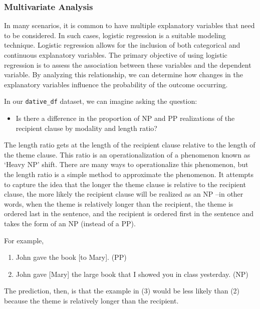 \documentclass[
  letterpaper,
  DIV=11,
  numbers=noendperiod]{scrreprt}
\providecommand{\tightlist}{%
  \setlength{\itemsep}{0pt}\setlength{\parskip}{0pt}}\usepackage{longtable,booktabs,array}
\theoremstyle{definition}
\theoremstyle{remark}
\begin{document}
\subsubsection{Multivariate Analysis}\label{multivariate-analysis}

In many scenarios, it is common to have multiple explanatory variables
that need to be considered. In such cases, logistic regression is a
suitable modeling technique. Logistic regression allows for the
inclusion of both categorical and continuous explanatory variables. The
primary objective of using logistic regression is to assess the
association between these variables and the dependent variable. By
analyzing this relationship, we can determine how changes in the
explanatory variables influence the probability of the outcome
occurring.

In our \texttt{dative\_df} dataset, we can imagine asking the question:

\begin{itemize}
\tightlist
\item
  Is there a difference in the proportion of NP and PP realizations of
  the recipient clause by modality and length ratio?
\end{itemize}

The length ratio gets at the length of the recipient clause relative to
the length of the theme clause. This ratio is an operationalization of a
phenomenon known as `Heavy NP' shift. There are many ways to
operationalize this phenomenon, but the length ratio is a simple method
to approximate the phenomenon. It attempts to capture the idea that the
longer the theme clause is relative to the recipient clause, the more
likely the recipient clause will be realized as an NP --in other words,
when the theme is relatively longer than the recipient, the theme is
ordered last in the sentence, and the recipient is ordered first in the
sentence and takes the form of an NP (instead of a PP).

For example,

\begin{enumerate}
\def\labelenumi{\arabic{enumi}.}
\tightlist
\item
  John gave the book {[}to Mary{]}. (PP)
\item
  John gave {[}Mary{]} the large book that I showed you in class
  yesterday. (NP)
\end{enumerate}

The prediction, then, is that the example in (3) would be less likely
than (2) because the theme is relatively longer than the recipient.
\end{document}
